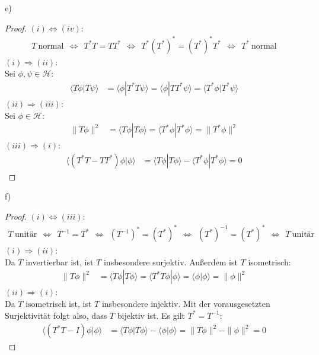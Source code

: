 \documentclass[a4paper,12pt]{article}
\newcommand{\brak}{}
\newcommand{\tecxt}{}
\begin{document}
e)
\begin{proof}
$(i)\Leftrightarrow(iv)$:\\
\begin{align*}
T\ \tecxt\text{normal}\ \ \Leftrightarrow\ \ T^\ast T = TT^\ast\ \ \Leftrightarrow\ \ T^\ast (T^\ast)^\ast = (T^\ast)^\ast T^\ast\ \ \Leftrightarrow\ \ T^\ast\ \tecxt\text{normal}
\end{align*}
$(i)\Rightarrow(ii)$:\\
Sei $\phi,\psi\in\mathcal{H}$:
\begin{align*}
\brak\langle {T\phi}| {T\psi}\rangle&=\brak\langle {\phi}| {T^\ast T\psi}\rangle=\brak\langle {\phi}| {TT^\ast\psi}\rangle=\brak\langle {T^\ast\phi}| {T^\ast\psi}\rangle
\end{align*}
$(ii)\Rightarrow(iii)$:\\
Sei $\phi\in\mathcal{H}$:
\begin{align*}
\|T\phi\|^2&=\brak\langle {T\phi}| {T\phi}\rangle=\brak\langle {T^\ast\phi}| {T^\ast\phi}\rangle=\|T^\ast\phi\|^2
\end{align*}
$(iii)\Rightarrow(i)$:\\
\begin{align*}
\brak\langle {(T^\ast T-TT^\ast)\phi}| {\phi}\rangle&=\brak\langle {T\phi}| {T\phi}\rangle-\brak\langle {T^\ast\phi}| {T^\ast\phi}\rangle=0
\end{align*}
\end{proof}
f)
\begin{proof}
$(i)\Leftrightarrow(iii)$:\\
\begin{align*}
T\ \tecxt\text{unitär}\ \ \Leftrightarrow\ \ T^{-1}=T^\ast\ \ \Leftrightarrow\ \ (T^{-1})^\ast=(T^\ast)^\ast\ \ \Leftrightarrow\ \ (T^\ast)^{-1}=(T^\ast)^\ast\ \ \Leftrightarrow\ \ T\ \tecxt\text{unitär}
\end{align*}
$(i)\Rightarrow(ii)$:\\
Da $T$ invertierbar ist, ist $T$ insbesondere surjektiv. Außerdem ist $T$ isometrisch:
\begin{align*}
\|T\phi\|^2&=\brak\langle {T\phi}| {T\phi}\rangle=\brak\langle {T^\ast T\phi}| {\phi}\rangle=\brak\langle {\phi}| {\phi}\rangle=\|\phi\|^2
\end{align*}
$(ii)\Rightarrow(i)$:\\
Da $T$ isometrisch ist, ist $T$ insbesondere injektiv. Mit der vorausgesetzten Surjektivität folgt also, dass $T$ bijektiv ist. Es gilt $T^\ast = T^{-1}$:
\begin{align*}
\brak\langle {(T^\ast T-I)\phi}| {\phi}\rangle&=\brak\langle {T\phi}| {T\phi}\rangle-\brak\langle {\phi}| {\phi}\rangle=\|T\phi\|^2-\|\phi\|^2=0
\end{align*}
\end{proof}
\end{document}
